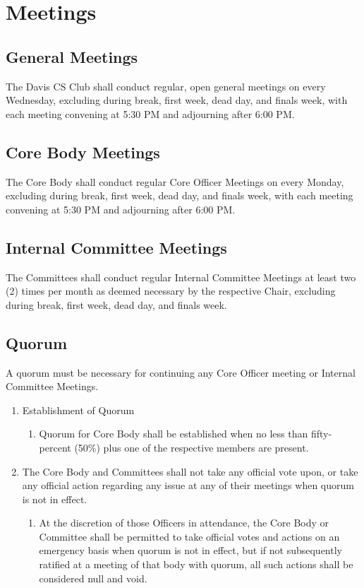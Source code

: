 \documentclass{article}
\newenvironment{li}{
\begin{enumerate}
  \setlength{\itemsep}{1pt}
  \setlength{\parskip}{0pt}
  \setlength{\parsep}{0pt}
}{\end{enumerate}}
\begin{document}
\section{Meetings}
\subsection{General Meetings}
The Davis CS Club shall conduct regular, open general meetings on every Wednesday, excluding during break, first week, dead day, and finals week, with each meeting convening at 5:30 PM and adjourning after 6:00 PM.

\subsection{Core Body Meetings}
The Core Body shall conduct regular Core Officer Meetings on every Monday, excluding during break, first week, dead day, and finals week, with each meeting convening at 5:30 PM and adjourning after 6:00 PM.

\subsection{Internal Committee Meetings}
The Committees shall conduct regular Internal Committee Meetings at least two (2) times per month as deemed necessary by the respective Chair, excluding during break, first week, dead day, and finals week.


\subsection{Quorum}
A quorum must be necessary for continuing any Core Officer meeting or Internal Committee Meetings.
\begin{li}
\item Establishment of Quorum
	\begin{li}
	\item Quorum for Core Body shall be established when no less than fifty-percent (50\%) plus one of the respective members are present.
	\end{li}
\item The Core Body and Committees shall not take any official vote upon, or take any official action regarding any issue at any of their meetings when quorum is not in effect.
	\begin{li}
	\item At the discretion of those Officers in attendance, the Core Body or Committee shall be permitted to take official votes and actions on an emergency basis when quorum is not in effect, but if not subsequently ratified at a meeting of that body with quorum, all such actions shall be considered null and void.
	\end{li}
\end{li}
\end{document}
